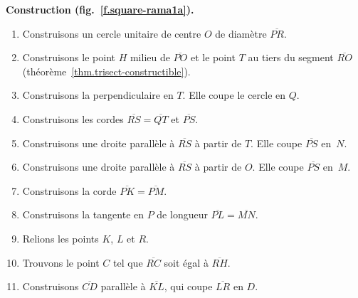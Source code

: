 \textbf{Construction (fig.~\ref{f.square-rama1a}).}
\begin{enumerate}

\item Construisons un cercle unitaire de centre $O$ de diamètre  $\overline{PR}$.

\item Construisons le point $H$ milieu de  $\overline{PO}$ et le point $T$ au tiers du segment $\overline{RO}$  (théorème~\ref{thm.trisect-constructible}).

\item Construisons la perpendiculaire en $T$. Elle coupe le cercle en $Q$.

\item Construisons les cordes $\overline{RS}=\overline{QT}$ et  $\overline{PS}$.

\item Construisons une droite parallèle à $\overline{RS}$ à partir de $T$. Elle coupe $\overline{PS}$ en~$N$.

\item Construisons une droite parallèle à $\overline{RS}$ à partir de $O$. Elle  coupe $\overline{PS}$ en~$M$.

\item Construisons la corde $\overline{PK}=\overline{PM}$.

\item Construisons la tangente en $P$ de longueur $\overline{PL}=\overline{MN}$.

\item Relions les points $K$, $L$ et $R$.

\item Trouvons le point $C$ tel que $\overline{RC}$ soit égal à $\overline{RH}$.

\item Construisons $\overline{CD}$ parallèle à $\overline{KL}$, qui coupe $\overline{LR}$ en $D$. 
\end{enumerate}

